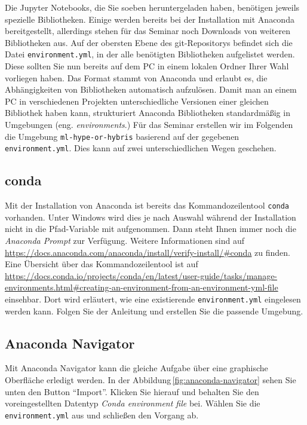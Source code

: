 \documentclass{tufte-handout}
\begin{document}
Die Jupyter Notebooks, die Sie soeben heruntergeladen haben, benötigen jeweils spezielle Bibliotheken.
Einige werden bereits bei der Installation mit Anaconda bereitgestellt, allerdings stehen für das Seminar noch Downloads von weiteren Bibliotheken aus.
Auf der obersten Ebene des git-Repositorys befindet sich die Datei \texttt{environment.yml}, in der alle benötigten Bibliotheken aufgelistet werden.
Diese sollten Sie nun bereits auf dem PC in einem lokalen Ordner Ihrer Wahl vorliegen haben.
Das Format stammt von Anaconda und erlaubt es, die Abhängigkeiten von Bibliotheken automatisch aufzulösen.
Damit man an einem PC in verschiedenen Projekten unterschiedliche Versionen einer gleichen Bibliothek haben kann,
strukturiert Anaconda Bibliotheken standardmäßig in Umgebungen (eng. \emph{environments}.)
Für das Seminar erstellen wir im Folgenden die Umgebung \texttt{ml-hype-or-hybris} basierend auf der gegebenen \texttt{environment.yml}.
Dies kann auf zwei unterschiedlichen Wegen geschehen.

\subsection{conda}

Mit der Installation von Anaconda ist bereits das Kommandozeilentool \texttt{conda} vorhanden.
Unter Windows wird dies je nach Auswahl während der Installation nicht in die Pfad-Variable mit aufgenommen.
Dann steht Ihnen immer noch die \emph{Anaconda Prompt} zur Verfügung.
Weitere Informationen sind auf
\url{https://docs.anaconda.com/anaconda/install/verify-install/#conda}
zu finden.
Eine Übersicht über das Kommandozeilentool ist auf
\url{https://docs.conda.io/projects/conda/en/latest/user-guide/tasks/manage-environments.html#creating-an-environment-from-an-environment-yml-file}
einsehbar.
Dort wird erläutert, wie eine existierende \texttt{environment.yml} eingelesen werden kann.
Folgen Sie der Anleitung und erstellen Sie die passende Umgebung.

\subsection{Anaconda Navigator}

Mit Anaconda Navigator kann die gleiche Aufgabe über eine graphische Oberfläche erledigt werden.
In der Abbildung\,\ref{fig:anaconda-navigator} sehen Sie unten den Button \enquote{Import}.  
Klicken Sie hierauf und behalten Sie den voreingestellten Datentyp \emph{Conda environment file} bei.
Wählen Sie die \texttt{environment.yml} aus und schließen den Vorgang ab.
\end{document}
